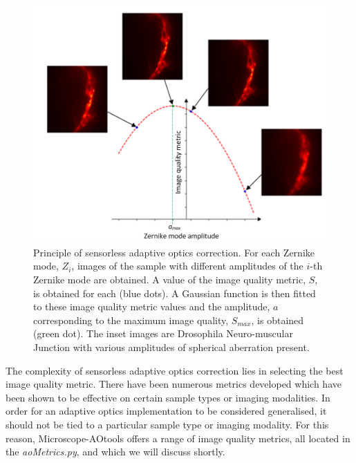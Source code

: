 \begin{figure}[h]
	\centering
	\includegraphics[width=1\textwidth,scale=0.5]{./images/sensorless_aberration_fitting_w_images.png}
	\caption{Principle of sensorless adaptive optics correction. For each Zernike mode, $Z_i$, images of the sample with different amplitudes of the $i$-th Zernike mode are obtained. A value of the image quality metric, $S$, is obtained for each (blue dots). A Gaussian function is then fitted to these image quality metric values and the amplitude, $a$ corresponding to the maximum image quality, $S_{max}$, is obtained (green dot). The inset images are Drosophila Neuro-muscular Junction with various amplitudes of spherical aberration present.}
	\label{fig:sensorless_correction_method}
\end{figure}

The complexity of sensorless adaptive optics correction lies in selecting the best image quality metric. There have been numerous metrics developed which have been shown to be effective on certain sample types or imaging modalities.\cite{burke2015adaptive,booth2002adaptive,fienup2003aberration,debarre2008adaptive} In order for an adaptive optics implementation to be considered generalised, it should not be tied to a particular sample type or imaging modality. For this reason, Microscope-AOtools offers a range of image quality metrics, all located in the \textit{aoMetrics.py}, and which we will discuss shortly.  

